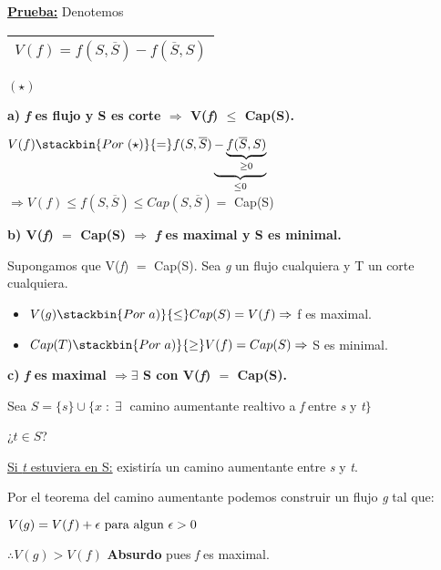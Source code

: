 \documentclass[12pt,a4paper]{report}
\begin{document}
		\textbf{\underline{Prueba:}} Denotemos \begin{tabular}{|c|} \hline $V(\textit{f}) = f(S, \overline{S}) - f(\overline{S},S)$ \\ \hline \end{tabular} $(\star)$
		
		\vspace{5mm}
		\textbf{a) \textit{f} es flujo y S es corte $\Rightarrow$ V(\textit{f}) $\leq$ Cap(S).}
		
			\begin{center}
				$V(f) \stackbin{Por \; (\star)}{=} f(S, \overline{S})\underbrace{-\underbrace{f(\overline{S}, S)}_{\geq 0}}_{\leq 0}$ \\
				
				\vspace{5mm}
				$\Rightarrow V(f ) \leq f(S, \overline{S}) \leq Cap(S, \overline{S}) =$ Cap(S)
			\end{center}
			
		\textbf{b) V(\textit{f}) $=$ Cap(S) $\Rightarrow$ \textit{f} es maximal y S es minimal.}
			
			\vspace{2mm}
			Supongamos que V(\textit{f}) $=$ Cap(S). Sea \textit{g} un flujo cualquiera y T un corte cualquiera.
			\begin{itemize}
				\item $V(g) \stackbin{Por \; a)}{\leq} Cap(S) = V(f) \Rightarrow$ f es maximal. 
				\item $Cap(T) \stackbin{Por \; a)}{\geq} V(f) = Cap(S) \Rightarrow$ S es minimal.
			\end{itemize}
		
		\vspace{5mm}
		\textbf{c) \textit{f} es maximal $\Rightarrow \exists$ S con V(\textit{f}) $=$ Cap(S).}
			
			\vspace{2mm}
			Sea $S = \{s\} \cup \{x \; : \; \exists \;$ camino aumentante realtivo a \textit{f} entre \textit{s} y \textit{t}$\}$
			
			\vspace{5mm}
			¿$t \in S$?

			\underline{Si \textit{t} estuviera en S:} existiría un camino aumentante entre \textit{s} y \textit{t}.
				
				Por el teorema del camino aumentante podemos construir un  flujo \textit{g} tal que:
				\begin{center}
					$V(g) = V(f) + \epsilon \textup{ para algun } \epsilon > 0$
					
					$\therefore V(g) > V(f)$ \textbf{Absurdo} pues \textit{f} es maximal.
				\end{center}
				
\end{document}
